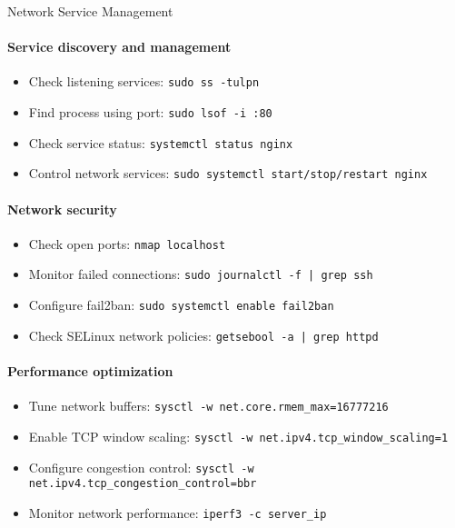 \begin{KR}{Network Service Management}\\
    \paragraph{Service discovery and management}
    \begin{itemize}
        \item Check listening services: \texttt{sudo ss -tulpn}
        \item Find process using port: \texttt{sudo lsof -i :80}
        \item Check service status: \texttt{systemctl status nginx}
        \item Control network services: \texttt{sudo systemctl start/stop/restart nginx}
    \end{itemize}
    
    \paragraph{Network security}
    \begin{itemize}
        \item Check open ports: \texttt{nmap localhost}
        \item Monitor failed connections: \texttt{sudo journalctl -f | grep ssh}
        \item Configure fail2ban: \texttt{sudo systemctl enable fail2ban}
        \item Check SELinux network policies: \texttt{getsebool -a | grep httpd}
    \end{itemize}
    
    \paragraph{Performance optimization}
    \begin{itemize}
        \item Tune network buffers: \texttt{sysctl -w net.core.rmem\_max=16777216}
        \item Enable TCP window scaling: \texttt{sysctl -w net.ipv4.tcp\_window\_scaling=1}
        \item Configure congestion control: \texttt{sysctl -w net.ipv4.tcp\_congestion\_control=bbr}
        \item Monitor network performance: \texttt{iperf3 -c server\_ip}
    \end{itemize}
\end{KR}